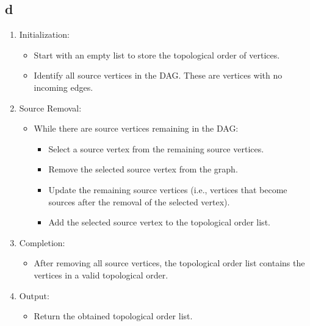 \documentclass{article}
\begin{document}
\newpage
\subsection*{d}
\begin{enumerate}
    \item Initialization:
          \begin{itemize}
              \item Start with an empty list to store the topological order of vertices.
              \item Identify all source vertices in the DAG. These are vertices with no incoming edges.
          \end{itemize}

    \item Source Removal:
          \begin{itemize}
              \item While there are source vertices remaining in the DAG:
                    \begin{itemize}
                        \item Select a source vertex from the remaining source vertices.
                        \item Remove the selected source vertex from the graph.
                        \item Update the remaining source vertices (i.e., vertices that become sources after the removal of the selected vertex).
                        \item Add the selected source vertex to the topological order list.
                    \end{itemize}
          \end{itemize}

    \item Completion:
          \begin{itemize}
              \item After removing all source vertices, the topological order list contains the vertices in a valid topological order.
          \end{itemize}

    \item Output:
          \begin{itemize}
              \item Return the obtained topological order list.
          \end{itemize}
\end{enumerate}
\end{document}
